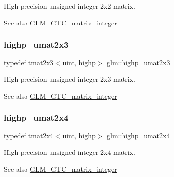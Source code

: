 High-\/precision unsigned integer 2x2 matrix. \begin{DoxySeeAlso}{See also}
\hyperlink{group__gtc__matrix__integer}{G\+L\+M\+\_\+\+G\+T\+C\+\_\+matrix\+\_\+integer} 
\end{DoxySeeAlso}
\mbox{\label{group__gtc__matrix__integer_gab058a0a12ea7f604d92baeb7a0e54f3b}} 
\subsubsection{\texorpdfstring{highp\+\_\+umat2x3}{highp\_umat2x3}}
{\footnotesize\ttfamily typedef \hyperlink{structglm_1_1tmat2x3}{tmat2x3}$<$\hyperlink{group__core__precision_ga4fd29415871152bfb5abd588334147c8}{uint}, highp$>$ \hyperlink{group__gtc__matrix__integer_gab058a0a12ea7f604d92baeb7a0e54f3b}{glm\+::highp\+\_\+umat2x3}}

High-\/precision unsigned integer 2x3 matrix. \begin{DoxySeeAlso}{See also}
\hyperlink{group__gtc__matrix__integer}{G\+L\+M\+\_\+\+G\+T\+C\+\_\+matrix\+\_\+integer} 
\end{DoxySeeAlso}
\mbox{\label{group__gtc__matrix__integer_gafcec07e857ea0445d93680411e86482c}} 
\subsubsection{\texorpdfstring{highp\+\_\+umat2x4}{highp\_umat2x4}}
{\footnotesize\ttfamily typedef \hyperlink{structglm_1_1tmat2x4}{tmat2x4}$<$\hyperlink{group__core__precision_ga4fd29415871152bfb5abd588334147c8}{uint}, highp$>$ \hyperlink{group__gtc__matrix__integer_gafcec07e857ea0445d93680411e86482c}{glm\+::highp\+\_\+umat2x4}}

High-\/precision unsigned integer 2x4 matrix. \begin{DoxySeeAlso}{See also}
\hyperlink{group__gtc__matrix__integer}{G\+L\+M\+\_\+\+G\+T\+C\+\_\+matrix\+\_\+integer} 
\end{DoxySeeAlso}
\mbox{\label{group__gtc__matrix__integer_ga58bc8d0aeac88af0d38723b5cfa4fa67}} 
